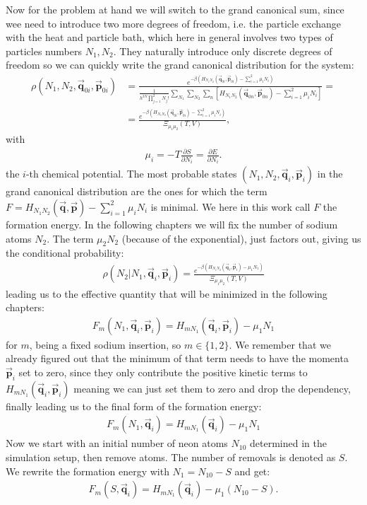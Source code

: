 Now for the problem at hand we will switch to the grand canonical sum, since wee need to introduce two more degrees of freedom, i.e. the particle exchange with the heat and particle bath, which here in general involves two types of particles numbers $N_1,N_2$. They naturally introduce only discrete degrees of freedom so we can quickly write the grand canonical distribution for the system:
\begin{align}
	\rho(N_1,N_2,\vec{\mathbf{q}}_{0i},\vec{\mathbf{p}}_{0i})&=\frac{e^{-\beta\left(H_{N_1N_2}(\vec{\mathbf{q}}_{0i},\vec{\mathbf{p}}_{0i})-\sum_{i=1}^{2}\mu_i N_i\right)}}{\frac{1}{h^{3N}\prod_{j=1}^{2}N_j!}\sum_{N_1}\sum_{N_2}\sum_{n}\left[H_{N_1N_2}(\vec{\mathbf{q}}_{0n},\vec{\mathbf{p}}_{0n})-\sum_{i=1}^{2}\mu_i N_i\right]}=\\
	&=\frac{e^{-\beta\left(H_{N_1N_2}(\vec{\mathbf{q}}_{0i},\vec{\mathbf{p}}_{0i})-\sum_{i=1}^{2}\mu_i N_i\right)}}{\Xi_{\mu_1\mu_2}(T,V)},
\end{align}
with 
\begin{align}
\mu_i = -T \frac{\partial S}{\partial N_i}=\frac{\partial E}{\partial N_i}.
\end{align} the $i$-th chemical potential.
The most probable states $(N_1,N_2,\vec{\mathbf{q}}_{i},\vec{\mathbf{p}}_{i})$ in the grand canonical distribution are the ones for which the term $F = H_{N_1N_2}(\vec{\mathbf{q}},\vec{\mathbf{p}})-\sum_{i=1}^{2}\mu_i N_i$ is minimal. We here in this work call $F$ the formation energy. In the following chapters we will fix the number of sodium atoms $N_2$. The term $\mu_2 N_2$ (because of the exponential), just factors out, giving us the conditional probability:
\begin{align}
	\rho(N_2 | N_1,\vec{\mathbf{q}}_{i},\vec{\mathbf{p}}_{i})=\frac{e^{-\beta\left(H_{N_1N_2}(\vec{\mathbf{q}}_{i},\vec{\mathbf{p}}_{i})-\mu_1 N_1\right)}}{\Xi_{\mu_1\mu_2}(T,V)}
\end{align}
leading us to the effective quantity that will be minimized in the following chapters:
\begin{align}
	F_m(N_1,\vec{\mathbf{q}}_{i},\vec{\mathbf{p}}_{i}) = H_{mN_1}(\vec{\mathbf{q}}_{i},\vec{\mathbf{p}}_{i}) - \mu_1 N_1
\end{align}for $m$, being a fixed sodium insertion, so $m\in\{1,2\}$. We remember that we already figured out that the minimum of that term needs to have the momenta $\vec{\mathbf{p}}_i$ set to zero, since they only contribute the positive kinetic terms to $H_{mN_1}(\vec{\mathbf{q}}_{i},\vec{\mathbf{p}}_{i})$ meaning we can just set them to zero and drop the dependency, finally leading us to the final form of the formation energy:
\begin{align}
	F_m(N_1,\vec{\mathbf{q}}_{i}) = H_{mN_1}(\vec{\mathbf{q}}_{i}) - \mu_1 N_1
\end{align}
Now we start with an initial number of neon atoms $N_{10}$ determined in the simulation setup, then remove atoms. The number of removals is denoted as $S$. We rewrite the formation energy with $N_1 = N_{10}-S$ and get:
\begin{align}
	F_m(S,\vec{\mathbf{q}}_{i}) = H_{mN_1}(\vec{\mathbf{q}}_{i}) - \mu_1 (N_{10}-S).
\end{align}

